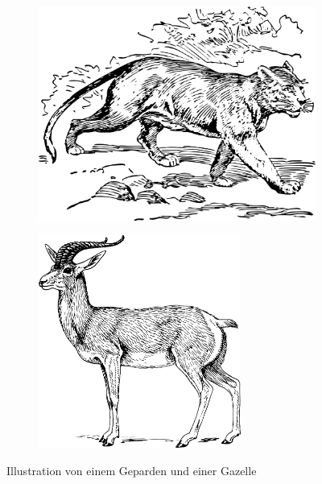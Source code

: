         \begin{figure}[htbp]
            \begin{subfigure}{0.5\textwidth}
                \includegraphics[width = 1\textwidth, left]{../pictures/cheetah.png}
            \end{subfigure}
            \begin{subfigure}{0.5\textwidth}
                \includegraphics[width = 0.73\textwidth, right]{../pictures/gazelle.png}
            \end{subfigure}
            \caption{Illustration von einem Geparden und einer Gazelle \label{fig:gazelleAndGepard}}
        \end{figure}
